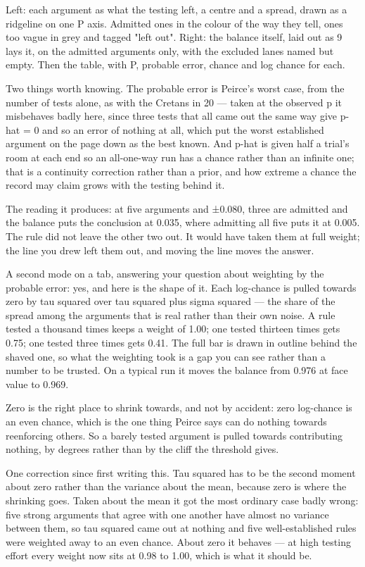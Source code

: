 Left: each argument as what the testing left, a centre and a spread, drawn as a
ridgeline on one P axis. Admitted ones in the colour of the way they tell, ones
too vague in grey and tagged "left out". Right: the balance itself, laid out as
9 lays it, on the admitted arguments only, with the excluded lanes named but
empty. Then the table, with P, probable error, chance and log chance for each.

Two things worth knowing. The probable error is Peirce's worst case, from the
number of tests alone, as with the Cretans in 20 — taken at the observed p it
misbehaves badly here, since three tests that all came out the same way give
p-hat = 0 and so an error of nothing at all, which put the worst established
argument on the page down as the best known. And p-hat is given half a trial's
room at each end so an all-one-way run has a chance rather than an infinite one;
that is a continuity correction rather than a prior, and how extreme a chance
the record may claim grows with the testing behind it.

The reading it produces: at five arguments and ±0.080, three are admitted and
the balance puts the conclusion at 0.035, where admitting all five puts it at
0.005. The rule did not leave the other two out. It would have taken them at
full weight; the line you drew left them out, and moving the line moves the
answer.

A second mode on a tab, answering your question about weighting by the probable
error: yes, and here is the shape of it. Each log-chance is pulled towards zero
by tau squared over tau squared plus sigma squared — the share of the spread
among the arguments that is real rather than their own noise. A rule tested a
thousand times keeps a weight of 1.00; one tested thirteen times gets 0.75; one
tested three times gets 0.41. The full bar is drawn in outline behind the shaved
one, so what the weighting took is a gap you can see rather than a number to be
trusted. On a typical run it moves the balance from 0.976 at face value to
0.969.

Zero is the right place to shrink towards, and not by accident: zero log-chance
is an even chance, which is the one thing Peirce says can do nothing towards
reenforcing others. So a barely tested argument is pulled towards contributing
nothing, by degrees rather than by the cliff the threshold gives.

One correction since first writing this. Tau squared has to be the second
moment about zero rather than the variance about the mean, because zero is where
the shrinking goes. Taken about the mean it got the most ordinary case badly
wrong: five strong arguments that agree with one another have almost no variance
between them, so tau squared came out at nothing and five well-established rules
were weighted away to an even chance. About zero it behaves — at high testing
effort every weight now sits at 0.98 to 1.00, which is what it should be.

